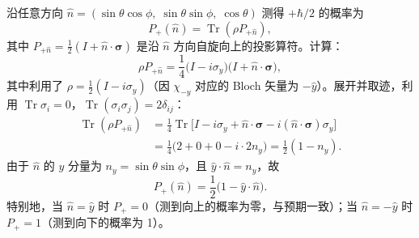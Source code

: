 \begin{solution}
沿任意方向 $\hat n = (\sin\theta\cos\phi,\;\sin\theta\sin\phi,\;\cos\theta)$ 测得 $+\hbar/2$ 的概率为
\[
P_+(\hat n) = \operatorname{Tr}(\rho P_{+\hat n}),
\]
其中 $P_{+\hat n} = \frac{1}{2}(I+\hat n\cdot\boldsymbol\sigma)$ 是沿 $\hat n$ 方向自旋向上的投影算符。计算：
\[
\rho P_{+\hat n} = \frac{1}{4}\bigl(I-i\sigma_y\bigr)\bigl(I+\hat n\cdot\boldsymbol\sigma\bigr),
\]
其中利用了 $\rho = \frac{1}{2}(I-i\sigma_y)$（因 $\chi_{-y}$ 对应的 Bloch 矢量为 $-\hat y$）。展开并取迹，利用 $\operatorname{Tr}\sigma_i=0$，$\operatorname{Tr}(\sigma_i\sigma_j)=2\delta_{ij}$：
\[
\begin{aligned}
\operatorname{Tr}(\rho P_{+\hat n})
&= \frac{1}{4}\operatorname{Tr}\bigl[I - i\sigma_y + \hat n\cdot\boldsymbol\sigma - i(\hat n\cdot\boldsymbol\sigma)\sigma_y\bigr]\\[2mm]
&= \frac{1}{4}\bigl(2 + 0 + 0 - i\cdot 2 n_y\bigr)
= \frac{1}{2}(1 - n_y).
\end{aligned}
\]
由于 $\hat n$ 的 $y$ 分量为 $n_y = \sin\theta\sin\phi$，且 $\hat y\cdot\hat n = n_y$，故
\[
\boxed{P_+(\hat n) = \frac{1}{2}\bigl(1 - \hat y\cdot\hat n\bigr).}
\]
特别地，当 $\hat n = \hat y$ 时 $P_+ = 0$（测到向上的概率为零，与预期一致）；当 $\hat n = -\hat y$ 时 $P_+ = 1$（测到向下的概率为 1）。
\end{solution}

